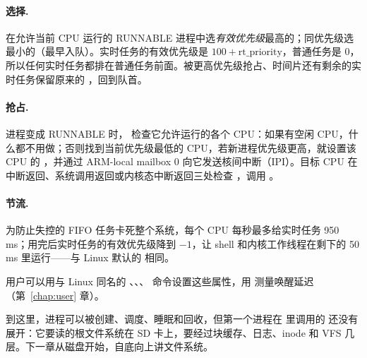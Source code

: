 \paragraph{选择.}  在允许当前 CPU 运行的 RUNNABLE 进程中选\emph{有效优先级}最高的；同优先级选  最小的（最早入队）。实时任务的有效优先级是 $100+\text{rt\_priority}$，普通任务是 0，所以任何实时任务都排在普通任务前面。被更高优先级抢占、时间片还有剩余的实时任务保留原来的 ，回到队首。

\paragraph{抢占.} 进程变成 RUNNABLE 时， 检查它允许运行的各个 CPU：如果有空闲 CPU，什么都不用做；否则找到当前优先级最低的 CPU，若新进程优先级更高，就设置该 CPU 的 ，并通过 ARM-local mailbox 0 向它发送核间中断（IPI）。目标 CPU 在中断返回、系统调用返回或内核态中断返回三处检查 ，调用 。

\paragraph{节流.} 为防止失控的 FIFO 任务卡死整个系统，每个 CPU 每秒最多给实时任务 950\,ms；用完后实时任务的有效优先级降到 $-1$，让 shell 和内核工作线程在剩下的 50\,ms 里运行——与 Linux 默认的  相同。

用户可以用与 Linux 同名的 、、、 命令设置这些属性，用  测量唤醒延迟（第~\ref{chap:user} 章）。

到这里，进程可以被创建、调度、睡眠和回收，但第一个进程在  里调用的  还没有展开：它要读的根文件系统在 SD 卡上，要经过块缓存、日志、inode 和 VFS 几层。下一章从磁盘开始，自底向上讲文件系统。

